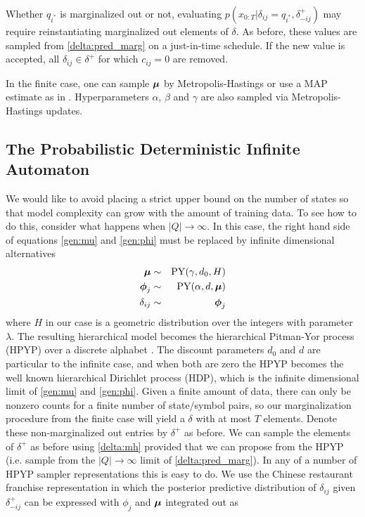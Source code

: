Whether $q_{i^*}$ is marginalized out or not, evaluating $p(x_{0:T}|\delta_{ij}=q_{i^*},\delta_{-ij}^+)$ may require reinstantiating marginalized out elements of $\delta$.  As before, these values are sampled from \eqref{delta:pred_marg} on a just-in-time schedule.  If the new value is accepted, all $\delta_{ij} \in \delta^+$ for which $c_{ij} = 0$ are removed.

In the finite case, one can sample $\bmu$ by Metropolis-Hastings or use a MAP estimate as in \cite{Mackay1995}.  Hyperparameters $\alpha$, $\beta$ and $\gamma$ are also sampled via Metropolis-Hastings updates.
 
 \subsection{The Probabilistic Deterministic Infinite Automaton}
 
We would like to avoid placing a strict upper bound on the number of states so that model complexity can grow with the amount of training data.  To see how to do this, consider what happens when $|Q|\rightarrow\infty$.   In this case, the right hand side of equations \eqref{gen:mu} and \eqref{gen:phi} must be replaced by infinite dimensional alternatives
%
\begin{eqnarray*}
\bmu &\sim& \mathrm{PY}(\gamma,d_0,H)\\
\bphi_j &\sim& \mathrm{PY}(\alpha, d, \bmu) \\
\delta_{ij} &\sim& \bphi_j
\end{eqnarray*}
%  
where $H$ in our case is a geometric distribution over the integers with parameter $\lambda$.   The resulting hierarchical model becomes the hierarchical Pitman-Yor process (HPYP) over a discrete alphabet \cite{Teh2006}.  The discount parameters $d_0$ and $d$ are particular to the infinite case, and when both are zero the HPYP becomes the well known hierarchical Dirichlet process (HDP), which is the infinite dimensional limit of \eqref{gen:mu} and \eqref{gen:phi}.
Given a finite amount of data, there can only be nonzero counts for a finite number of state/symbol pairs, so our marginalization procedure from the finite case will yield a $\delta$ with at most $T$ elements.  Denote these non-marginalized out entries by $\delta^+$ as before.  We can sample the elements of $\delta^+$ as before using \eqref{delta:mh} provided that we can propose from the HPYP (i.e. sample from the  $|Q|\rightarrow\infty$ limit of \eqref{delta:pred_marg}).  In any of a number of HPYP sampler representations this is easy to do.  We use the Chinese restaurant franchise representation \cite{Teh2006} in which the posterior predictive distribution of $\delta_{ij}$ given $\delta_{-ij}^+$ can be expressed with $\phi_j$ and $\bmu$ integrated out as

